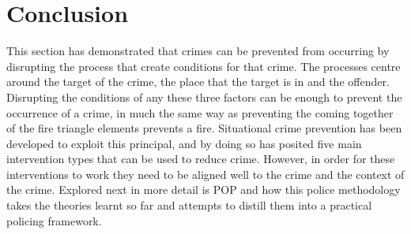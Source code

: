 \section{Conclusion} This section has demonstrated that crimes can be prevented from occurring by disrupting the process that create conditions for that crime. The processes centre around the target of the crime, the place that the target is in and the offender. Disrupting the conditions of any these three factors can be enough to prevent the occurrence of a crime, in much the same way as preventing the coming together of the fire triangle elements prevents a fire. Situational crime prevention has been developed to exploit this principal, and by doing so has posited five main intervention types that can be used to reduce crime. However, in order for these interventions to work they need to be aligned well to the crime and the context of the crime. Explored next in more detail is POP and how this police methodology takes the theories learnt so far and attempts to distill them into a practical policing framework. 


